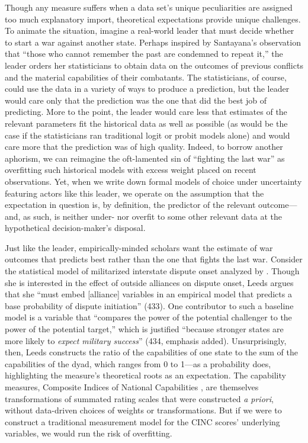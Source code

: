 Though any measure suffers when a data set's unique peculiarities are assigned too much explanatory import, theoretical expectations provide unique challenges.  To animate the situation, imagine a real-world leader that must decide whether to start a war against another state.
Perhaps inspired by Santayana's observation that ``those who cannot remember the past are condemned to repeat it,'' the leader orders her statisticians to obtain data on the outcomes of previous conflicts and the material capabilities of their combatants.
The statisticians, of course, could use the data in a variety of ways to produce a prediction, but the leader would care only that the prediction was the one that did the best job of predicting.
More to the point, the leader would care less that estimates of the relevant parameters fit the historical data as well as possible (as would be the case if the statisticians ran traditional logit or probit models alone) and would care more that the prediction was of high quality.
Indeed, to borrow another aphorism, we can reimagine the oft-lamented sin of ``fighting the last war'' \citep[e.g.][]{hart1972} as overfitting such historical models with excess weight placed on recent observations.
Yet, when we write down formal models of choice under uncertainty featuring actors like this leader, we operate on the assumption that the expectation in question is, by definition, the predictor of the relevant outcome---and, as such, is neither under- nor overfit to some other relevant data at the hypothetical decision-maker's disposal.

Just like the leader, empirically-minded scholars want the estimate of war outcomes that predicts best rather than the one that fights the last war.
Consider the statistical model of militarized interstate dispute onset analyzed by \citet{leeds2003}.
Though she is interested in the effect of outside alliances on dispute onset, Leeds argues that she ``must embed [alliance] variables in an empirical model that predicts a base probability of dispute initiation'' (433).
One contributor to such a baseline model is a variable that ``compares the power of the potential challenger to the power of the potential target,'' which is justified ``because stronger states are more likely to \emph{expect military success}'' (434, emphasis added).
Unsurprisingly, then, Leeds constructs the ratio of the capabilities of one state to the sum of the capabilities of the dyad, which ranges from 0 to 1---as a probability does, highlighting the measure's theoretical roots as an expectation.
The capability measures, Composite Indices of National Capabilities \citep{singer1972}, are themselves transformations of summated rating scales that were constructed \textit{a priori}, without data-driven choices of weights or transformations.
But if we were to construct a traditional measurement model for the CINC scores' underlying variables, we would run the risk of overfitting.

